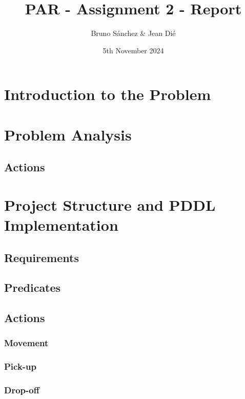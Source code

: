 \documentclass{article}
\begin{document}
\title{PAR - Assignment 2 - Report}
\author{\normalsize Bruno Sánchez \& Jean Dié}
\date{\small 5th November 2024}

\maketitle

\section{Introduction to the Problem}


\section{Problem Analysis}

\subsection{Actions}

\section{Project Structure and PDDL Implementation}


\subsection{Requirements}

\subsection{Predicates}

\subsection{Actions}

\subsubsection{Movement}

\subsubsection{Pick-up}

\subsubsection{Drop-off}
\end{document}

